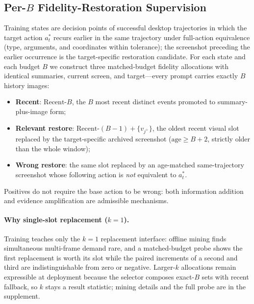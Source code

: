 \documentclass[letterpaper]{article} %
\begin{document}
\subsection{Per-$B$ Fidelity-Restoration Supervision}

Training states are decision points of successful desktop trajectories in
which the target action $a^*_t$ recurs earlier in the same trajectory under
full-action equivalence (type, arguments, and coordinates within tolerance);
the screenshot preceding the earlier occurrence is the target-specific
restoration candidate. For each state and each budget $B$ we construct
three matched-budget fidelity allocations with identical summaries, current
screen, and target---every prompt carries exactly $B$ history images:
\begin{itemize}
    \item \textbf{Recent}: $\mathrm{Recent}\text{-}B$, the $B$ most recent
    distinct events promoted to summary-plus-image form;
    \item \textbf{Relevant restore}: $\mathrm{Recent}\text{-}(B{-}1)+
    \{v_{j^{+}}\}$, the oldest recent visual slot replaced by the
    target-specific archived screenshot
    ($\mathrm{age}\geq B{+}2$, strictly older than the whole window);
    \item \textbf{Wrong restore}: the same slot replaced by an age-matched
    same-trajectory screenshot whose following action is \emph{not}
    equivalent to $a^*_t$.
\end{itemize}
Positives do not require the base action to be wrong: both information
addition and evidence amplification are admissible mechanisms.

\paragraph{Why single-slot replacement ($k{=}1$).}
Training teaches only the $k{=}1$ replacement interface: offline mining
finds simultaneous multi-frame demand rare, and a matched-budget probe
shows the first replacement is worth its slot while the paired increments
of a second and third are indistinguishable from zero or negative.
Larger-$k$ allocations remain expressible at deployment because the
selector composes exact-$B$ sets with recent fallback, so $k$ stays a
result statistic; mining details and the full probe are in the
supplement.
\end{document}

